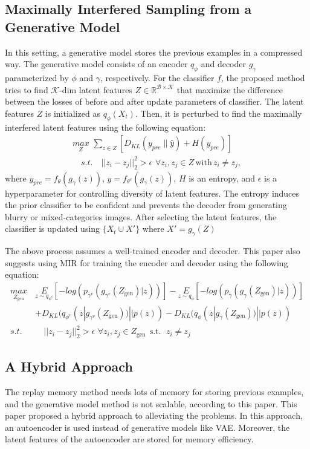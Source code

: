 \documentclass[10pt,twocolumn,letterpaper]{article}
\begin{document}
\subsection{Maximally Interfered Sampling from a Generative Model}
In this setting, a generative model stores the previous examples in a compressed way. The generative model consists of an encoder $q_{\phi}$ and decoder $g_{\gamma}$ parameterized by $\phi$ and $\gamma$, respectively. For the classifier $f$, the proposed method tries to find $\mathcal{K}$-dim latent features $Z \in \mathbb{R}^{\mathcal{B}\times \mathcal{K}}$ that maximize the difference between the losses of before and after update parameters of classifier. The latent features $Z$ is initialized as $q_{\phi}(X_t)$. Then, it is perturbed to find the maximally interfered latent features using the following equation:
\begin{align}
\label{eq:gen_retrieval}
\underset{Z}{max}\,\, \sum_{z \in Z}[D_{KL}(y_{pre}\parallel \hat{y}) + H(y_{pre})] \\\nonumber
\quad
s.t.   \quad ||z_i-z_j||_2^2 > \epsilon\,\,
\forall  z_i,z_j \in Z \,\text{with} \, z_i\neq z_j,
\end{align}
where $y_{pre}=f_{\theta}(g_\gamma(z))$, $\hat{y}=f_{\theta^v}(g_\gamma(z))$, $H$ is an entropy, and $\epsilon$ is a hyperparameter for controlling diversity of latent features. The entropy induces the prior classifier to be confident and prevents the decoder from generating blurry or mixed-categories images. After selecting the latent features, the classifier is updated using $\{X_t \cup X'\}$ where $X' = g_{\gamma}(Z)$

The above process assumes a well-trained encoder and decoder. This paper also suggests using MIR for training the encoder and decoder using the following equation:
\begin{align}
\label{eq:gen_retrieval_for_gen}
\underset{Z_{\text{gen}}}{max} \, &\underset{z\sim q_{\phi^v}}{E}[-log (p_{\gamma^v}(g_{\gamma^v}(Z_{\text{gen}})|z))]-\underset{z\sim q_{\phi}}{E}[-log (p_{\gamma}(g_{\gamma}(Z_{\text{gen}})|z))]\nonumber\\
& + D_{KL}(q_{\phi^v}(z|g_{\gamma^v}(Z_{\text{gen}}))||p(z)) - D_{KL}(q_{\phi}(z|g_{\gamma}(Z_{\text{gen}}))||p(z))\\
s.t. &\quad ||z_i-z_j||_2^2 > \epsilon\,
\, \forall  z_i,z_j \in Z_{\text{gen}} ~~\text{s.t.} ~~\, z_i\neq z_j \nonumber
\end{align}

\subsection{A Hybrid Approach}
The replay memory method needs lots of memory for storing previous examples, and the generative model method is not scalable, according to this paper. This paper proposed a hybrid approach to alleviating the problems. In this approach, an autoencoder is used instead of generative models like VAE. Moreover, the latent features of the autoencoder are stored for memory efficiency.
\end{document}
